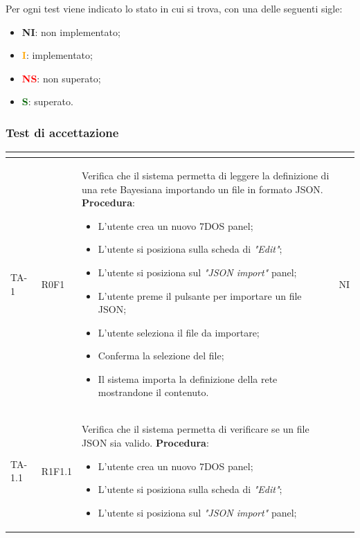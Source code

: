 Per ogni test viene indicato lo stato in cui si trova, con una delle seguenti sigle:
\begin{itemize}
	\item \textbf{NI}: non implementato;
	\item \textcolor{orange}{\textbf{I}}: implementato;
	\item \textcolor{red}{\textbf{NS}}: non superato;
	\item \textcolor{darkgreen}{\textbf{S}}: superato.
\end{itemize}
\subsubsection{Test di accettazione}
\normalsize
\renewcommand{\arraystretch}{1}
\begin{longtable}{|C{2.5cm}|C{2.5cm}|L{6.5cm}|C{1.5cm}|}
	\hline
	\textbf{\color{title_text}{Test}} & \textbf{\color{title_text}{Requisito}} & \textbf{\color{title_text}{Descrizione}} & \textbf{\color{title_text}{Stato}} \\
	\hline
	\endhead
	{TA-1} & {R0F1} & 
	Verifica che il sistema permetta di leggere la definizione di una rete Bayesiana importando un file in formato JSON.
	\textbf{Procedura}:
	\begin{itemize}		
		\item L'utente crea un nuovo 7DOS panel;
		\item L'utente si posiziona sulla scheda di \emph{"Edit"};
		\item L'utente si posiziona sul \emph{"JSON import"} panel;
		\item L'utente preme il pulsante per importare un file JSON;
		\item L'utente seleziona il file da importare;
		\item Conferma la selezione del file;
		\item Il sistema importa la definizione della rete mostrandone il contenuto.
	\end{itemize}
	  & {NI}\\
	\hline
	{TA-1.1} & {R1F1.1} & Verifica che il sistema permetta di verificare se un file JSON sia valido.
	\textbf{Procedura}:
	\begin{itemize}		
		\item L'utente crea un nuovo 7DOS panel;
		\item L'utente si posiziona sulla scheda di \emph{"Edit"};
		\item L'utente si posiziona sul \emph{"JSON import"} panel;

\end{itemize}
\end{longtable}
